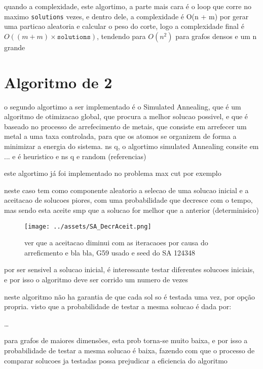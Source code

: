 \documentclass[mirror, portugues]{revdetua}
\begin{document}
quando a complexidade, este algortimo, a parte mais cara é o loop que corre no maximo \texttt{solutions} vezes, e dentro dele, a complexidade é O(n + m) por gerar uma particao aleatoria e calcular o peso do corte, logo a complexidade final é $O((m + m) \times \texttt{solutions})$, tendendo para $O(n^2)$ para grafos densos e um n grande




\section{Algoritmo de 2}


o segundo algortimo a ser implementado é o Simulated Annealing, que é um algoritmo de otimizacao global, que procura a melhor solucao possivel, e que é baseado no processo de arrefecimento de metais, que consiste em arrefecer um metal a uma taxa controlada, para que os atomos se organizem de forma a minimizar a energia do sistema. ns q, o algortimo simulated Annealing consite em ... e é heuristico e ns q e random (referencias)

este algortimo já foi implementado no problema max cut por exemplo \cite{SAT15}

neste caso tem como componente aleatorio a selecao de uma solucao inicial e a aceitacao de solucoes piores, com uma probabilidade que decresce com o tempo, mas sendo esta aceite smp que a solucao for melhor que a anterior (determinisico)

\begin{figure}[h]
    \centering
    \texttt{[image: ../assets/SA\_DecrAceit.png]}
    \caption{ver que a aceitacao diminui com as iteracaoes por causa do arreficmento e bla bla, G59 usado e seed do SA 124348}
    \label{fig:sa_aceitacao}
\end{figure}

por ser sensivel a solucao inicial, é interessante testar diferentes solucoes iniciais, e por isso o algoritmo deve ser corrido um numero de vezes

neste algoritmo não ha garantia de que cada sol so é testada uma vez, por opção propria. visto que a probabilidade de testar a mesma solucao é dada por:

\dots

para grafos de maiores dimensões, esta prob torna-se muito baixa, e por isso a probabilidade de testar a mesma solucao é baixa, fazendo com que o processo de comparar solucoes ja testadas possa prejudicar a eficiencia do algoritmo 
\end{document}
